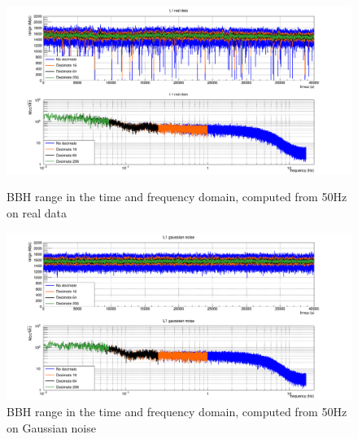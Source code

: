%

\begin{figure}
  \centering
  \begin{minipage}{\linewidth}
    \includegraphics[width=\linewidth]{sectionBadTriggers/PSD/Range/range_PSD/cReal_L1_50Hz_BBH.png}
    \caption{BBH range in the time and frequency domain, computed from 50Hz on real data}
    \label{fig:rangeReal_BBH_50}
  \end{minipage}
  \hfill
  \vspace{0.4cm}
  \begin{minipage}{\linewidth}
    \includegraphics[width=\linewidth]{sectionBadTriggers/PSD/Range/range_PSD/cGaus_L1_50Hz_BBH.png}
    \caption{BBH range in the time and frequency domain, computed from 50Hz on Gaussian noise}
    \label{fig:rangeGaus_BBH_50}
  \end{minipage}
\end{figure}



